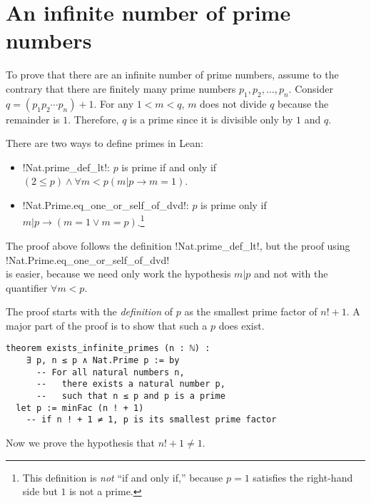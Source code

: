 
\section{An infinite number of prime numbers}

To prove that there are an infinite number of prime numbers, assume to the contrary that there are finitely many prime numbers $p_1,p_2,\ldots,p_n$. Consider $q=(p_1p_2\cdots p_n)+1$. For any $1<m<q$, $m$ does not divide $q$ because the remainder is $1$. Therefore, $q$ is a prime since it is divisible only by $1$ and $q$.

There are two ways to define primes in Lean:
\begin{itemize}
\item !Nat.prime_def_lt!: $p$ is prime if and only if $(2\leq p) \wedge \forall m < p (m|p \rightarrow m=1)$.

\item !Nat.Prime.eq_one_or_self_of_dvd!: $p$ is prime only if $m|p \rightarrow (m=1 \vee m=p)$.\footnote{This definition is \emph{not} ``if and only if,'' because $p=1$ satisfies the right-hand side but $1$ is not a prime.}

\end{itemize}
The proof above follows the definition !Nat.prime_def_lt!, but the proof using\\
\indnt{}!Nat.Prime.eq_one_or_self_of_dvd!\\
is easier, because we need only work the hypothesis $m|p$ and not with the quantifier $\forall m<p$.

The proof starts with the \emph{definition} of $p$ as the smallest prime factor of \UndefineShortVerb{\!}$n!+1$.\DefineShortVerb{\!}  A major part of the proof is to show that such a $p$ does exist.

\begin{Verbatim}
theorem exists_infinite_primes (n : ℕ) :
    ∃ p, n ≤ p ∧ Nat.Prime p := by
      -- For all natural numbers n,
      --   there exists a natural number p,
      --   such that n ≤ p and p is a prime
  let p := minFac (n ! + 1)
    -- if n ! + 1 ≠ 1, p is its smallest prime factor
\end{Verbatim}


Now we prove the hypothesis that \UndefineShortVerb{\!}$n!+1 \neq 1$.\DefineShortVerb{\!}

